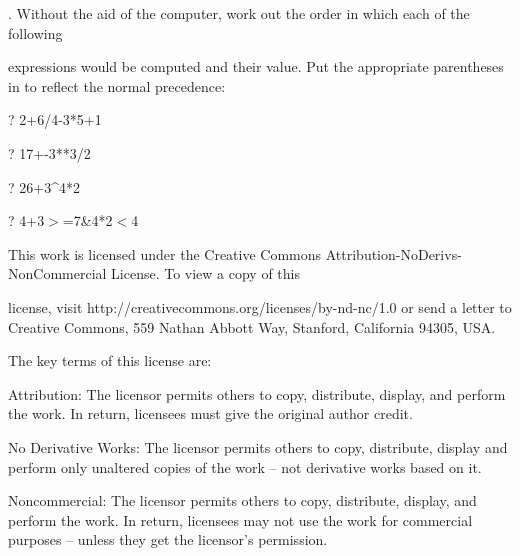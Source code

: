 \documentclass[a4paper,11pt]{book}
\begin{document}
\noindent 

.   Without the aid of the computer, work out the order in which each of the following

\noindent expressions would be computed and their value. Put the appropriate parentheses in to reflect the normal precedence:

\noindent 

\noindent 

\noindent ? 2+6/4-3*5+1

\noindent ? 17+-3**3/2

\noindent ? 26+3\^{}4*2

\noindent ? 4+3$>$=7\textbar {}\&4*2$<$4

\noindent  

\noindent  

\noindent  

\noindent  

\noindent 

\noindent 

\noindent 

\noindent This work is licensed under the Creative Commons Attribution-NoDerivs-NonCommercial License. To view a copy of this

\noindent license, visit http://creativecommons.org/licenses/by-nd-nc/1.0 or send a letter to Creative Commons, 559 Nathan Abbott Way, Stanford, California 94305, USA.

\noindent 

\noindent The key terms of this license are:

\noindent 

\noindent Attribution: The licensor permits others to copy, distribute, display, and perform the work. In return, licensees must give the original author credit.

\noindent 

\noindent No  Derivative  Works: The licensor permits others to copy, distribute, display and perform only unaltered copies of the work -- not derivative works based on it.

\noindent 

\noindent Noncommercial: The licensor permits others to copy, distribute, display, and perform the work. In return, licensees may not use the work for commercial purposes -- unless they get the licensor's permission.
\end{document}
